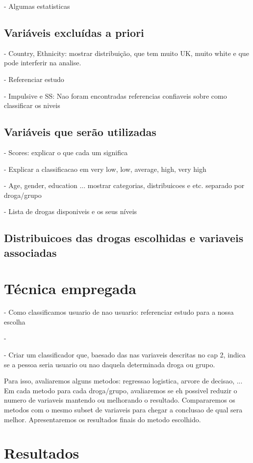 \documentclass[
	article,			%
	11pt,				%
	oneside,			%
	a4paper,			%
	english,			%
	brazil,				%
	sumario=tradicional
	]{abntex2}
\begin{document}
- Algumas estatisticas

\subsection{Variáveis excluídas a priori}

- Country, Ethnicity: mostrar distribuição, que tem muito UK, muito white e que pode interferir na analise.

- Referenciar estudo

- Impulsive e SS: Nao foram encontradas referencias confiaveis sobre como classificar os niveis

\subsection{Variáveis que serão utilizadas}

- Scores: explicar o que cada um significa

- Explicar a classificacao em very low, low, average, high, very high

- Age, gender, education ... mostrar categorias, distribuicoes e etc. separado por droga/grupo

- Lista de drogas disponiveis e os seus níveis

\subsection{Distribuicoes das drogas escolhidas e variaveis associadas}

\section{Técnica empregada}

- Como classificamos usuario de nao usuario: referenciar estudo para a nossa escolha

- 

- Criar um classificador que, baesado das nas variaveis descritas no cap 2, indica se a pessoa seria usuario ou nao daquela determinada droga ou grupo. 

Para isso, avaliaremos alguns metodos: regressao logistica, arvore de decisao, ... Em cada metodo para cada droga/grupo, avaliaremos se eh possivel reduzir o numero de variaveis mantendo ou melhorando o resultado. Compararemos os metodos com o mesmo subset de variaveis para chegar a conclusao de qual sera melhor. Apresentaremos os resultados finais do metodo escolhido. 

\section{Resultados}
\end{document}
